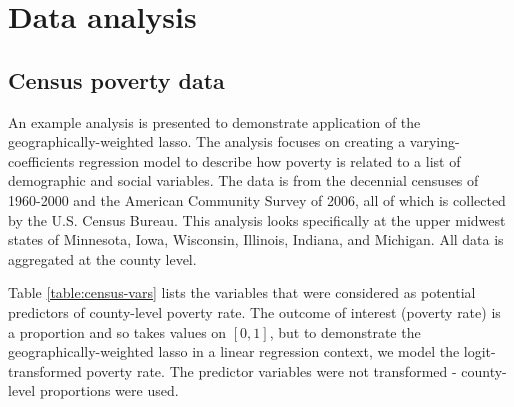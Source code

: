 \documentclass[authoryear, review, 11pt]{elsarticle}
\begin{document}

	


			
\section{Data analysis}
	\subsection{Census poverty data}
	An example analysis is presented to demonstrate application of the geographically-weighted lasso. The analysis focuses on creating a varying-coefficients regression model to describe how poverty is related to a list of demographic and social variables. The data is from the decennial censuses of 1960-2000 and the American Community Survey of 2006, all of which is collected by the U.S. Census Bureau. This analysis looks specifically at the upper midwest states of Minnesota, Iowa, Wisconsin, Illinois, Indiana, and Michigan. All data is aggregated at the county level.
	
	Table \ref{table:census-vars} lists the variables that were considered as potential predictors of county-level poverty rate. The outcome of interest (poverty rate) is a proportion and so takes values on $[0,1]$, but to demonstrate the geographically-weighted lasso in a linear regression context, we model the logit-transformed poverty rate. The predictor variables were not transformed - county-level proportions were used.
	
\end{document}
